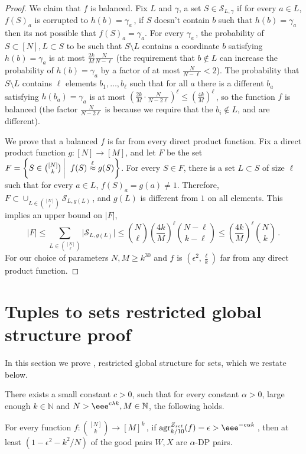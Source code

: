 \documentclass{toc}
\newcommand{\Paren}[1]{\left(#1\right)} %
\newcommand{\abs}[1]{\lvert#1\rvert} %
\newcommand\sett[2]{\left\{ #1 \left| \; \vphantom{#1 #2} \right. #2  \right\}} %
\newcommand\f{f} %
\newcommand\setf{f} %
\newcommand{\g}{g} %
\newcommand\pf{g} %
\newcommand{\test}[2]{
	\ifx &#2&
	\textrm{agr}^{#1}
	\else	
	\textrm{agr}^{#1}_{#2}
	\fi}
\newcommand\neql[1]{\stackrel{{#1}}{ \approx}} %
\newcommand{\sets}{\binom{[N]}{k}} %
\begin{document}
\begin{proof}
	We claim that $\f$ is balanced.
	Fix $L$ and $\gamma$, a set $S\in\mathcal{S}_{L,\gamma}$ if for every $a\in L$, $\f(S)_a$ is corrupted to $h(b)=\gamma_a$\,, if $S$ doesn't contain $b$ such that $h(b)=\gamma_a$ then its not possible that $\f(S)_a = \gamma_a$. For every $\gamma_a$\,, the probability of $S\subset [N], L\subset S$ to be such that $S\setminus L$ contains a coordinate $b$ satisfying $h(b) = \gamma_a$ is at most $\frac{2k}{M}\frac{N}{N-\ell}$ (the requirement that $b\notin L$ can increase the probability of $h(b) = \gamma_a$ by a factor of at most $\frac{N}{N-\ell} < 2$).
	The probability that $S\setminus L$ contains $\ell$ elements $b_1,\ldots, b_\ell$ such that for all $a$ there is a different $b_a$ satisfying $h(b_a) = \gamma_a$ is at most $\Paren{\frac{2k}{M}\cdot\frac{N}{N-2\ell}}^\ell\leq \Paren{\frac{4k}{M}}^\ell$\,, so the function $\f$ is balanced (the factor $\frac{N}{N-2\ell}$ is because we require that the $b_i\notin L$, and are different).
	
	We prove that a balanced $\f$ is far from every direct product function. Fix a direct product function $\g:[N]\rightarrow[M]$, and let $F$ be the set  $F = \sett{S\in \sets }{\f(S)\neql{\ell}\pf(S)}$. For every $S\in F$, there is a set $L\subset S$ of size $\ell$ such that for every $a\in L$, $\f(S)_a = \pf(a)\neq 1$. Therefore, $F\subset \cup_{L\in\binom{[N]}{\ell}}\mathcal{S}_{L,\pf(L)}$\,, and $\pf(L)$ is different from $1$ on all elements. This implies an upper bound on $\abs{F}$,
	\[ \abs{F} \leq \sum_{L\in\binom{[N]}{\ell}}\abs{\mathcal{S}_{L,\pf(L)}}\leq \binom{N}{\ell}\Paren{\frac{4k}{M}}^\ell\binom{N-\ell}{k-\ell}\leq \Paren{\frac{4k}{M}}^\ell \binom{N}{k}\,.\] %
    For our choice of parameters $N,M\geq k^{30}$ and $\f$ is $(\epsilon^2,\frac{\ell}{k})$ far from any direct product function.
\end{proof}

\appendix

	
\section{Tuples to sets restricted global structure proof}
\label{app:tup to sets local}
In this section we prove , restricted global structure for sets, which we restate below.
\begin{lemma}
	There exists a small constant $c>0$, such that for every constant $\alpha>0$, large enough $k\in\mathbb{N}$ and $N > \eee^{c\lambda k},M\in\mathbb{N}$, the following holds.
	
	For every function  $\setf:\sets\rightarrow[M]^k$\,, if $\test{Z_{set}}{k/10}(\setf)=\epsilon > \eee^{-c\alpha k}$\,, then  at least $(1-\epsilon^2-
	k^2/N)$ %
	 of the good pairs $W,X$ are $\alpha$-DP pairs.
\end{lemma}
\end{document}
